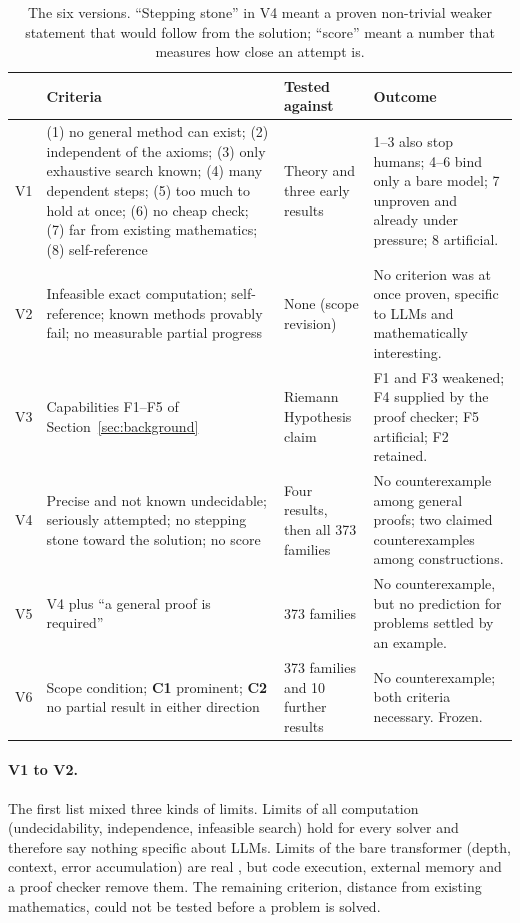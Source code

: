\documentclass[11pt,a4paper]{article}
\theoremstyle{prob}
\newcommand{\Cone}{\textbf{C1}}
\newcommand{\Ctwo}{\textbf{C2}}
\begin{document}
\begin{table}[!htb]
\centering\footnotesize
\begin{tabularx}{\textwidth}{L{0.7cm} L{5.3cm} L{3.3cm} Y}
\toprule
 & Criteria & Tested against & Outcome\\
\midrule
V1 & (1) no general method can exist; (2) independent of the axioms; (3) only exhaustive search known; (4) many dependent steps; (5) too much to hold at once; (6) no cheap check; (7) far from existing mathematics; (8) self-reference & Theory and three early results \cite{udopenai,nexus,nsopenai} & 1--3 also stop humans; 4--6 bind only a bare model; 7 unproven and already under pressure; 8 artificial.\\
V2 & Infeasible exact computation; self-reference; known methods provably fail; no measurable partial progress & None (scope revision) & No criterion was at once proven, specific to LLMs and mathematically interesting.\\
V3 & Capabilities F1--F5 of Section~\ref{sec:background} & Riemann Hypothesis claim & F1 and F3 weakened; F4 supplied by the proof checker; F5 artificial; F2 retained.\\
V4 & Precise and not known undecidable; seriously attempted; no stepping stone toward the solution; no score & Four results, then all 373 families & No counterexample among general proofs; two claimed counterexamples among constructions.\\
V5 & V4 plus ``a general proof is required'' & 373 families & No counterexample, but no prediction for problems settled by an example.\\
V6 & Scope condition; \Cone{} prominent; \Ctwo{} no partial result in either direction & 373 families and 10 further results & No counterexample; both criteria necessary. Frozen.\\
\bottomrule
\end{tabularx}
\caption{The six versions. ``Stepping stone'' in V4 meant a proven non-trivial weaker statement that would follow from the solution; ``score'' meant a number that measures how close an attempt is.}\label{tab:versions}
\end{table}

\paragraph{V1 to V2.} The first list mixed three kinds of limits. Limits of all computation (undecidability, independence, infeasible search) hold for every solver and therefore say nothing specific about LLMs. Limits of the bare transformer (depth, context, error accumulation) are real \cite{ms24,cpw}, but code execution, external memory and a proof checker remove them. The remaining criterion, distance from existing mathematics, could not be tested before a problem is solved.
\end{document}
